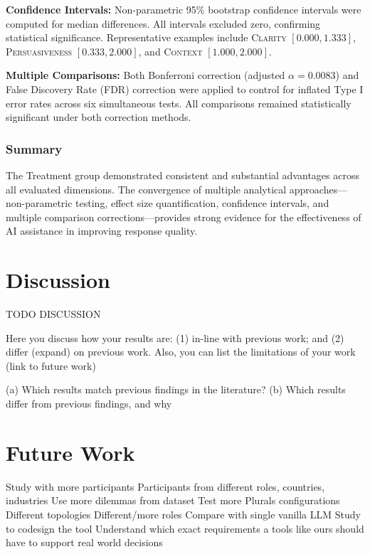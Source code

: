 \documentclass[sigconf, authorversion, nonacm, screen]{acmart}
\begin{document}
\textbf{Confidence Intervals:} Non-parametric 95\% bootstrap confidence intervals were computed for median differences. All intervals excluded zero, confirming statistical significance. Representative examples include \textsc{Clarity} $[0.000, 1.333]$, \textsc{Persuasiveness} $[0.333, 2.000]$, and \textsc{Context} $[1.000, 2.000]$.

\textbf{Multiple Comparisons:} Both Bonferroni correction (adjusted $\alpha = 0.0083$) and False Discovery Rate (FDR) correction were applied to control for inflated Type I error rates across six simultaneous tests. All comparisons remained statistically significant under both correction methods.

\subsubsection{Summary}

The Treatment group demonstrated consistent and substantial advantages across all evaluated dimensions. The convergence of multiple analytical approaches—non-parametric testing, effect size quantification, confidence intervals, and multiple comparison corrections—provides strong evidence for the effectiveness of AI assistance in improving response quality.
\section{Discussion}
TODO DISCUSSION

Here you discuss how your results are: (1) in-line with previous work; and (2) differ
(expand) on previous work. Also, you can list the limitations of your work (link to future work)

(a) Which results match previous findings in the literature?
(b) Which results differ from previous findings, and why

\section{Future Work}

Study with more participants
Participants from different roles, countries, industries
Use more dilemmas from dataset
Test more Plurals configurations
Different topologies
Different/more roles
Compare with single vanilla LLM
Study to codesign the tool
Understand which exact requirements a tools like ours should have to support real world decisions

\end{document}
